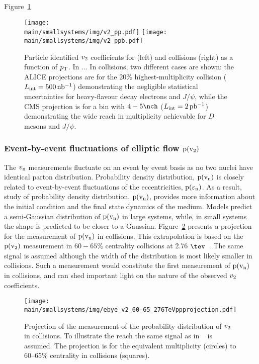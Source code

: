 \documentclass[../report.tex]{subfiles}
\providecommand{\main}{..}
\begin{document}
Figure~\ref{fig:smallsystems_corr_cumulants_pid}

\begin{figure}[ht]
\centering
\texttt{[image: \\main/smallsystems/img/v2\_pp.pdf]}
\hfill
\texttt{[image: \\main/smallsystems/img/v2\_ppb.pdf]}

\caption{Particle identified $v_{\rm{2}}$ coefficients for \pp (left) and \pPb collisions (right) as a function of $p\sb{\scriptstyle\mathrm{T}}$. In \pp... In \pPb collisions, two different cases are shown: the ALICE projections are for the 20\% highest-multiplicity collision ($L_{\rm int} = \unit[500]{nb^{-1}}$) demonstrating the negligible statistical uncertainties for heavy-flavour decay electrons and $J/\psi$, while the CMS projection is for a bin with $4-5 \nch$ ($L_{\rm int} = \unit[2]{pb^{-1}}$) demonstrating the wide reach in multiplicity achievable for $D$ mesons and $J/\psi$.
}
\label{fig:smallsystems_corr_cumulants_pid}
\end{figure}

\subsubsection{Event-by-event fluctuations of elliptic flow $\rm{p}(v_{\rm{2}})$}

The $v_{\rm{n}}$ measurements fluctuate on an event by event basis as no two nuclei have identical parton distribution. Probability density distribution, $\rm{p}(v_{\rm{n}})$ is closely related to event-by-event fluctuations of the eccentricities, $\rm{p}(\varepsilon_{\rm{n}})$. As a result, study of probability density distribution, $\rm{p}(v_{\rm{n}})$,  provides more information about the initial condition and the final state dynamics of the medium. Models predict a semi-Gaussian distribution of $\rm{p}(v_{\rm{n}})$ in large systems, while, in small systems the shape is predicted to be closer to a Gaussian. Figure~\ref{fig:smallsystems_corr_pvn} presents a projection for the measurement of $\rm{p}(v_{\rm{n}})$ in \pp collisions. This extrapolation is based on the $\rm{p}(v_{\rm{2}})$ measurement in $60-65\%$ centrality \PbPb collisions at \sqrtsNN{} 2.76 $\tev$~\cite{Aad:2013xma}. The same signal is assumed although the width of the distribution is most likely smaller in \pp collisions. Such a measurement would constitute the first measurement of $\rm{p}(v_{\rm{n}})$ in \pp collisions, and can shed important light on the nature of the observed $v_{\rm{2}}$ coefficients.

\begin{figure}[ht]
\centering
\texttt{[image: \\main/smallsystems/img/ebye\_v2\_60-65\_276TeVppprojection.pdf]}

\caption{Projection of the measurement of the probability distribution of $v_{\rm{2}}$ in \pp collisions. To illustrate the reach the same signal as in \PbPb~\cite{Aad:2013xma} is assumed. The projection is for the equivalent \pp multiplicity (circles) to 60--65\% centrality in \PbPb collisions (squares).}
\label{fig:smallsystems_corr_pvn}
\end{figure}
\end{document}
